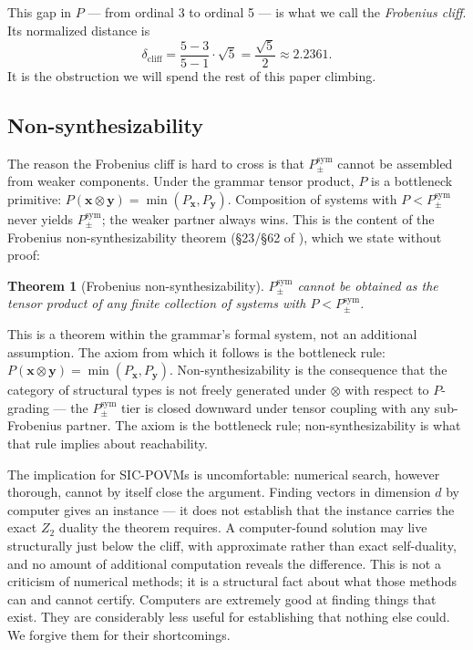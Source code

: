 \documentclass[12pt]{article}
\theoremstyle{plain}
\newtheorem{theoreminner}{Theorem}[section]
\theoremstyle{definition}
\theoremstyle{remark}
\newenvironment{theorem}{\begin{mdframed}[style=thmstyle]\begin{theoreminner}}{\end{theoreminner}\end{mdframed}}
\begin{document}
This gap in $P$ — from ordinal 3 to ordinal 5 — is what we call the \emph{Frobenius cliff}. Its normalized distance is
\[
  \delta_{\mathrm{cliff}} = \frac{5 - 3}{5 - 1} \cdot \sqrt{5} = \frac{\sqrt{5}}{2} \approx 2.2361.
\]
It is the obstruction we will spend the rest of this paper climbing.

\subsection{Non-synthesizability}

The reason the Frobenius cliff is hard to cross is that $P_\pm^{\mathrm{sym}}$ cannot be assembled from weaker components. Under the grammar tensor product, $P$ is a bottleneck primitive: $P(\mathbf{x} \otimes \mathbf{y}) = \min(P_\mathbf{x}, P_\mathbf{y})$. Composition of systems with $P < P_\pm^{\mathrm{sym}}$ never yields $P_\pm^{\mathrm{sym}}$; the weaker partner always wins. This is the content of the Frobenius non-synthesizability theorem (§23/§62 of \cite{synthref}), which we state without proof:

\begin{theorem}[Frobenius non-synthesizability]
  \label{thm:nonsyn}
  $P_\pm^{\mathrm{sym}}$ cannot be obtained as the tensor product of any finite collection of systems with $P < P_\pm^{\mathrm{sym}}$.
\end{theorem}

This is a theorem within the grammar's formal system, not an additional assumption. The axiom from which it follows is the bottleneck rule: $P(\mathbf{x} \otimes \mathbf{y}) = \min(P_\mathbf{x}, P_\mathbf{y})$. Non-synthesizability is the consequence that the category of structural types is not freely generated under $\otimes$ with respect to $P$-grading — the $P_\pm^{\mathrm{sym}}$ tier is closed downward under tensor coupling with any sub-Frobenius partner. The axiom is the bottleneck rule; non-synthesizability is what that rule implies about reachability.

The implication for SIC-POVMs is uncomfortable: numerical search, however thorough, cannot by itself close the argument. Finding vectors in dimension $d$ by computer gives an instance — it does not establish that the instance carries the exact $Z_2$ duality the theorem requires. A computer-found solution may live structurally just below the cliff, with approximate rather than exact self-duality, and no amount of additional computation reveals the difference. This is not a criticism of numerical methods; it is a structural fact about what those methods can and cannot certify. Computers are extremely good at finding things that exist. They are considerably less useful for establishing that nothing else could. We forgive them for their shortcomings.
\end{document}

